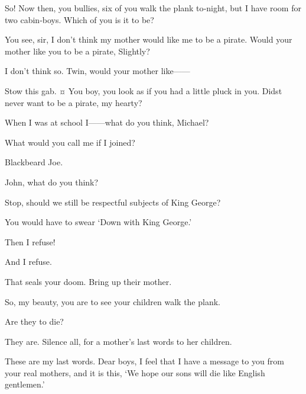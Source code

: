 \begin{drama}
So!
Now then, you bullies, six of you walk the plank to‐night, but I have room for two cabin‐boys.
Which of you is it to be?

You see, sir, I don’t think my mother would like me to be a pirate.
Would your mother like you to be a pirate, Slightly?

I don’t think so.
Twin, would your mother like——

\hookspeaks
Stow this gab.
¤
You boy, you look as if you had a little pluck in you.
Didst never want to be a pirate, my hearty?

When I was at school I——what do you think, Michael?

What would you call me if I joined?

\hookspeaks
Blackbeard Joe.

\michaelspeaks
John, what do you think?

\johnspeaks
Stop, should we still be respectful subjects of King George?

\hookspeaks
You would have to swear ‘Down with King George.’

Then I refuse!

\michaelspeaks
And I refuse.

\hookspeaks
That seals your doom.
Bring up their mother.


So, my beauty, you are to see your children walk the plank.

Are they to die?

\hookspeaks
They are.
Silence all, for a mother’s last words to her children.

\wendyspeaks
These are my last words.
Dear boys, I feel that I have a message to you from your real mothers, and it is this,
‘We hope our sons will die like English gentlemen.’



\end{drama}
